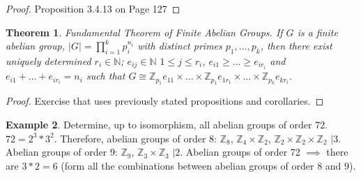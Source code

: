 \documentclass[11pt]{article}
\newtheorem{thm}{Theorem}[section]
\theoremstyle{definition}
\newtheorem{example}[thm]{Example}
\numberwithin{equation}{section}
\newcommand{\Z}{\mathbb{Z}}
\newcommand{\N}{\mathbb{N}} %
\begin{document}
\begin{proof}
Proposition 3.4.13 on Page 127
\end{proof}
\begin{thm}
Fundamental Theorem of Finite Abelian Groups. If $G$ is a finite abelian group, $|G| = \prod\limits_{i=1}^k p_{i}^{n_{i}}$ with distinct primes $p_1,...,p_k$, then there exist uniquely determined $r_i \in \N$; $e_{ij} \in \N$ $1 \leq j \leq r_{i}$, $e_{i1} \geq...\geq e_{ir_{i}}$ and $e_{i1}+...+e_{ir_{i}} = n_{i}$ such that $G \cong \Z_{p_{1}}e_{11} \times...\times \Z_{p_{1}}e_{1r_{1}} \times...\times \Z_{p_{k}}e_{kr_{i}}$.
\end{thm}
\begin{proof}
Exercise that uses previously stated propositions and corollaries.
\end{proof}
\begin{example}
Determine, up to isomorphism, all abelian groups of order 72. $72 = 2^{3} * 3^{2}$. Therefore, abelian groups of order $8$: $\Z_8$, $\Z_4 \times \Z_2$, $\Z_2 \times \Z_2 \times \Z_2$ $\mid 3$. Abelian groups of order 9: $\Z_9$, $\Z_3 \times \Z_3$ $\mid 2$. Abelian groups of order 72 $\implies$ there are $3*2 = 6$ (form all the combinations between abelian groups of order $8$ and $9$).
\end{example}
\end{document}
